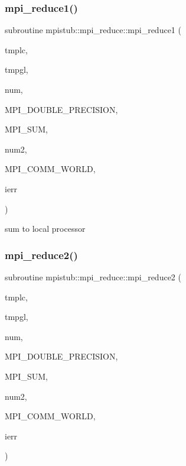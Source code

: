 \mbox{\label{interfacempistub_1_1mpi__reduce_a3f7961cd892ce3d82b0a8104ced672d3}} 
\subsubsection{\texorpdfstring{mpi\_reduce1()}{mpi\_reduce1()}}
{\footnotesize\ttfamily subroutine mpistub\+::mpi\+\_\+reduce\+::mpi\+\_\+reduce1 (\begin{DoxyParamCaption}\item[{double precision, dimension(\+:)}]{tmplc,  }\item[{double precision, dimension(\+:)}]{tmpgl,  }\item[{}]{num,  }\item[{}]{M\+P\+I\+\_\+\+D\+O\+U\+B\+L\+E\+\_\+\+P\+R\+E\+C\+I\+S\+I\+ON,  }\item[{}]{M\+P\+I\+\_\+\+S\+UM,  }\item[{}]{num2,  }\item[{}]{M\+P\+I\+\_\+\+C\+O\+M\+M\+\_\+\+W\+O\+R\+LD,  }\item[{}]{ierr }\end{DoxyParamCaption})}



sum to local processor 

\mbox{\label{interfacempistub_1_1mpi__reduce_a7b271773423478f20fd2b987744da5b3}} 
\subsubsection{\texorpdfstring{mpi\_reduce2()}{mpi\_reduce2()}}
{\footnotesize\ttfamily subroutine mpistub\+::mpi\+\_\+reduce\+::mpi\+\_\+reduce2 (\begin{DoxyParamCaption}\item[{double precision}]{tmplc,  }\item[{double precision}]{tmpgl,  }\item[{}]{num,  }\item[{}]{M\+P\+I\+\_\+\+D\+O\+U\+B\+L\+E\+\_\+\+P\+R\+E\+C\+I\+S\+I\+ON,  }\item[{}]{M\+P\+I\+\_\+\+S\+UM,  }\item[{}]{num2,  }\item[{}]{M\+P\+I\+\_\+\+C\+O\+M\+M\+\_\+\+W\+O\+R\+LD,  }\item[{}]{ierr }\end{DoxyParamCaption})}

